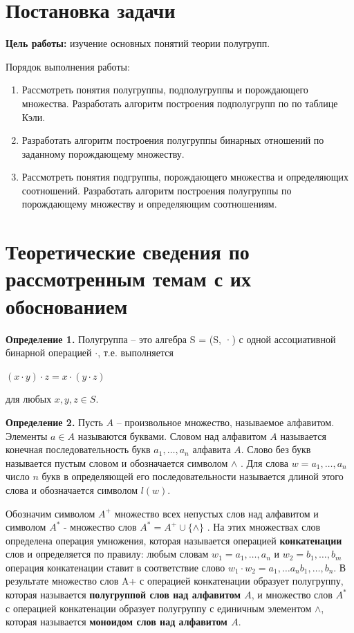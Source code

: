\documentclass[bachelor, och, labwork]{shiza}
\begin{document}

\section{Постановка задачи}

  \textbf{Цель работы:} изучение основных понятий теории полугрупп.
  
  Порядок выполнения работы:
    \begin{enumerate}
        \item Рассмотреть понятия полугруппы, подполугруппы и порождающего множества. 
        Разработать алгоритм построения подполугрупп по по таблице Кэли.
        \item Разработать алгоритм построения полугруппы бинарных отношений по заданному порождающему множеству.
        \item Рассмотреть понятия подгруппы, порождающего множества  и определяющих соотношений. 
        Разработать алгоритм построения полугруппы по порождающему множеству и определяющим соотношениям.
    \end{enumerate}

\section{Теоретические сведения по рассмотренным темам с их обоснованием}
    \textbf{Определение 1.} Полугруппа – это алгебра S = (S, ·) с одной ассоциативной бинарной
    операцией $\cdot$, т.е. выполняется
      \begin{center}
        $(x \cdot y) \cdot z = x \cdot (y \cdot z)$
      \end{center}
    для любых $x,y,z \in S$.
    
    \textbf{Определение 2.} Пусть $A$ – произвольное множество, называемое алфавитом. Элементы $a \in A$ называются буквами. Словом над алфавитом $A$
    называется конечная последовательность букв $a_1, \dots , a_n$ алфавита $A$. Слово без букв называется пустым словом и обозначается
    символом $\wedge$ . Для слова $w = a_1, \dots , a_n$ число $n$ букв в определяющей его последовательности называется длиной этого слова и обозначается
    символом $l (w)$.

    Обозначим символом $A^{+}$ множество всех непустых слов над алфавитом и символом $A^{*}$ - множество слов $A^{*} = A^{+} \cup \{\wedge\}$ . На этих
    множествах слов определена операция умножения, которая называется операцией \textbf{конкатенации} слов и определяется по правилу: любым словам 
    $w_1 = a_1, \dots , a_n$ и $w_2 = b_1, \dots , b_m$ операция конкатенации ставит в соответствие слово $w_1 \cdot w_2 = a_1, \dots a_n b_1, \dots ,b_n$.
    В результате множество слов A+ с операцией конкатенации образует полугруппу, которая называется \textbf{полугруппой слов над алфавитом $A$}, и множество
    слов $A^{*}$ с операцией конкатенации образует полугруппу с единичным элементом $\wedge$, которая называется \textbf{моноидом слов над алфавитом $A$}.
\end{document}

